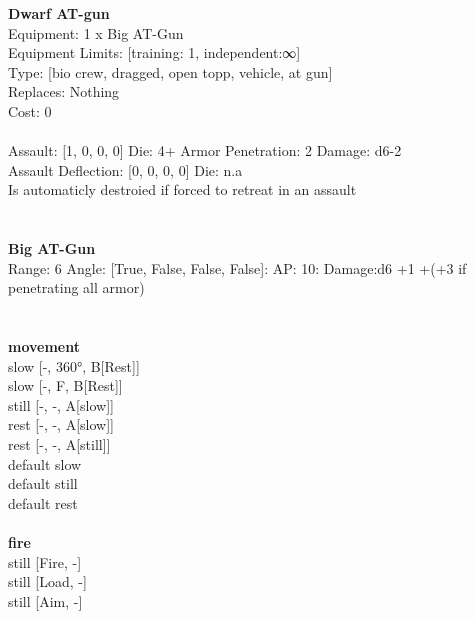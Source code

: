 {\bf Dwarf AT-gun } \\
Equipment: 1 x Big AT-Gun \\
Equipment Limits: [training: 1, independent:∞] \\
Type: [bio crew, dragged, open topp, vehicle, at gun] \\
Replaces: Nothing \\
Cost: 0\\
\ \\
Assault: [1, 0, 0, 0] Die: 4+ Armor Penetration: 2 Damage: d6-2 \\
Assault Deflection: [0, 0, 0, 0] Die: n.a\\
\indent Is automaticly destroied if forced to retreat in an assault\\ 
 
\ \\

\ \\
{\bf Big AT-Gun } \\



Range: 6  Angle: [True, False, False, False]: AP: 10: Damage:d6 +1 +(+3 if penetrating all armor) \\




 
\ \\



\ \\ {\bf movement } \\
slow [-, 360°, B[Rest]] \\
slow [-, F, B[Rest]] \\
still [-, -, A[slow]] \\
rest [-, -, A[slow]] \\
rest [-, -, A[still]] \\
default slow \\
default still \\
default rest \\
\ \\ {\bf fire } \\
still [Fire, -] \\
still [Load, -] \\
still [Aim, -] \\


